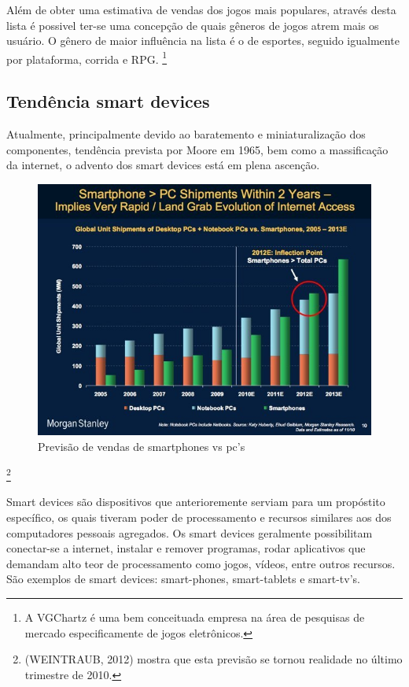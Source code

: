 \documentclass{article}
\begin{document}
Além de obter uma estimativa de vendas dos jogos mais populares, através desta lista é possivel ter-se uma concepção de quais gêneros de jogos atrem mais os usuário. O gênero de maior influência na lista é o de esportes, seguido igualmente por plataforma, corrida e RPG.
\footnote{A VGChartz é uma bem conceituada   empresa na área de pesquisas de mercado especificamente de jogos eletrônicos.}

\subsection{Tendência smart devices}

Atualmente, principalmente devido ao baratemento e miniaturalização dos componentes, tendência prevista por Moore em 1965, bem como a massificação da internet, o advento dos smart devices está em plena ascenção. 

\newpage

\begin{figure}[!htbp]
    \begin{center}
        \includegraphics[width=\textwidth]{asset/img/smartvscomputer.jpg}
               \caption{Previsão de vendas de smartphones vs pc's}
    \end{center}
\end{figure}

\footnote{(WEINTRAUB, 2012) mostra que esta previsão se tornou realidade no último trimestre de 2010.}

Smart devices são dispositivos que anterioremente serviam para um propóstito específico, os quais tiveram poder de processamento e recursos similares aos dos computadores pessoais agregados. Os smart devices geralmente possibilitam conectar-se a internet, instalar e remover programas, rodar aplicativos que demandam alto teor de processamento como jogos, vídeos, entre outros recursos. São exemplos de smart devices: smart-phones, smart-tablets e smart-tv's.
\end{document}
